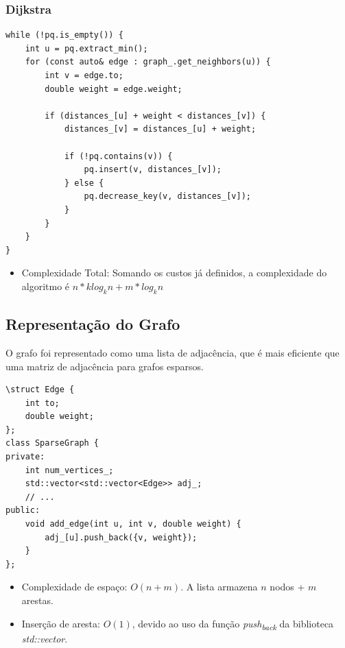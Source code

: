 \documentclass{infufrgs}
\begin{document}
%
%
\subsubsection{Dijkstra}
\begin{Verbatim}[frame=single, fontsize=\footnotesize]
while (!pq.is_empty()) {
    int u = pq.extract_min();   
    for (const auto& edge : graph_.get_neighbors(u)) {
        int v = edge.to;
        double weight = edge.weight;

        if (distances_[u] + weight < distances_[v]) {
            distances_[v] = distances_[u] + weight;
            
            if (!pq.contains(v)) {
                pq.insert(v, distances_[v]); 
            } else {
                pq.decrease_key(v, distances_[v]); 
            }
        }
    }
}
\end{Verbatim}
\begin{itemize}
    \item Complexidade Total: Somando os custos já definidos, a complexidade
     do algoritmo é $n * k log_{k}n + m * log_{k}n$
\end{itemize}





\subsection{Representação do Grafo}
O grafo foi representado como uma lista de adjacência, que é mais eficiente que uma matriz de adjacência
para grafos esparsos. 


\begin{Verbatim}[frame=single, fontsize=\footnotesize]
\struct Edge {
    int to;
    double weight;
};
class SparseGraph {
private:
    int num_vertices_;
    std::vector<std::vector<Edge>> adj_;
    // ...
public:
    void add_edge(int u, int v, double weight) {
        adj_[u].push_back({v, weight});
    }
};
\end{Verbatim}

 \begin{itemize}
    \item Complexidade de espaço: $O(n+m)$. A lista armazena $n$ nodos + $m$ arestas. 
    \item Inserção de aresta: $O(1)$, devido ao uso da função \textit{push\textsubscript{back}} da 
    biblioteca \textit{std::vector}. 
 \end{itemize}
\end{document}

